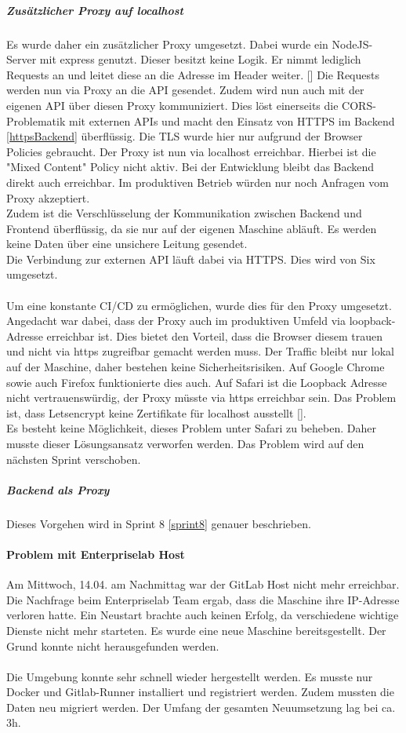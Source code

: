 \subparagraph{Zusätzlicher Proxy auf localhost}\label{corsLocalhost}
Es wurde daher ein zusätzlicher Proxy umgesetzt. Dabei wurde ein NodeJS-Server mit express genutzt. Dieser besitzt keine Logik. Er nimmt lediglich Requests an und leitet diese an die Adresse im Header weiter. [\cite{corsProxy}] Die Requests werden nun via Proxy an die API gesendet. Zudem wird nun auch mit der eigenen API über diesen Proxy kommuniziert. Dies löst einerseits die \ac{CORS}-Problematik mit externen APIs und macht den Einsatz von HTTPS im Backend \ref{httpsBackend} überflüssig. Die \ac{TLS} wurde hier nur aufgrund der Browser Policies gebraucht. Der Proxy ist nun via localhost erreichbar. Hierbei ist die "Mixed Content" Policy nicht aktiv. Bei der Entwicklung bleibt das Backend direkt auch erreichbar. Im produktiven Betrieb würden nur noch Anfragen vom Proxy akzeptiert. \\
Zudem ist die Verschlüsselung der Kommunikation zwischen Backend und Frontend überflüssig, da sie nur auf der eigenen Maschine abläuft. Es werden keine Daten über eine unsichere Leitung gesendet. \\
Die Verbindung zur externen API läuft dabei via HTTPS. Dies wird von Six umgesetzt.\\\\
Um eine konstante \ac{CI/CD} zu ermöglichen, wurde dies für den Proxy umgesetzt. 
Angedacht war dabei, dass der Proxy auch im produktiven Umfeld via loopback-Adresse erreichbar ist. Dies bietet den Vorteil, dass die Browser diesem trauen und nicht via https zugreifbar gemacht werden muss. Der Traffic bleibt nur lokal auf der Maschine, daher bestehen keine Sicherheitsrisiken. Auf Google Chrome sowie auch Firefox funktionierte dies auch. Auf Safari ist die Loopback Adresse nicht vertrauenswürdig, der Proxy müsste via https erreichbar sein. Das Problem ist, dass Letsencrypt keine Zertifikate für localhost ausstellt [\cite{letsencryptLocalhost}].\\
Es besteht keine Möglichkeit, dieses Problem unter Safari zu beheben. Daher musste dieser Lösungsansatz verworfen werden. Das Problem wird auf den nächsten Sprint verschoben. 

\subparagraph{Backend als Proxy}
Dieses Vorgehen wird in Sprint 8 \ref{sprint8} genauer beschrieben. 
\paragraph{Problem mit Enterpriselab Host}
Am Mittwoch, 14.04. am Nachmittag war der GitLab Host nicht mehr erreichbar. Die Nachfrage beim Enterpriselab Team ergab, dass die Maschine ihre IP-Adresse verloren hatte. Ein Neustart brachte auch keinen Erfolg, da verschiedene wichtige Dienste nicht mehr starteten. Es wurde eine neue Maschine bereitsgestellt. Der Grund konnte nicht herausgefunden werden. \\\\
Die Umgebung konnte sehr schnell wieder hergestellt werden. Es musste nur Docker und Gitlab-Runner installiert und registriert werden. Zudem mussten die Daten neu migriert werden. Der Umfang der gesamten Neuumsetzung lag bei ca. 3h. 

